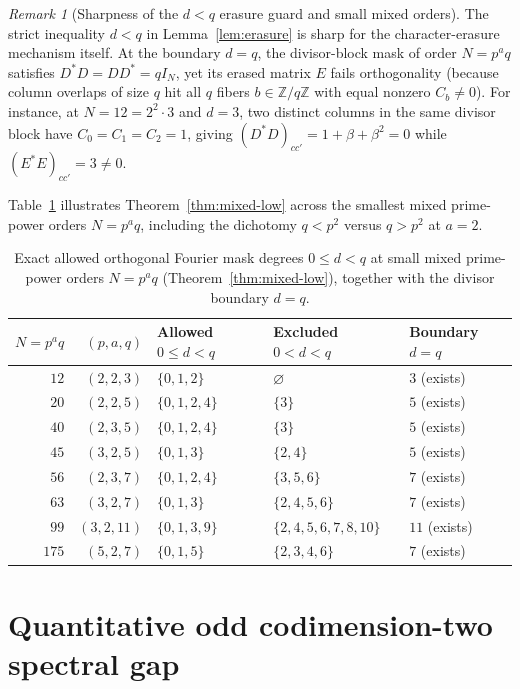 \documentclass[11pt,reqno]{amsart}
\numberwithin{equation}{section}
\theoremstyle{definition}
\theoremstyle{remark}
\newtheorem{remark}[theorem]{Remark}
\newcommand{\Z}{\mathbb{Z}}
\begin{document}
\begin{remark}[Sharpness of the $d<q$ erasure guard and small mixed orders]
\label{rem:boundary-guard}
The strict inequality $d<q$ in Lemma~\ref{lem:erasure} is sharp for the character-erasure mechanism itself. At the boundary $d=q$, the divisor-block mask of order $N=p^a q$ satisfies $D^*D=DD^*=qI_N$, yet its erased matrix $E$ fails orthogonality (because column overlaps of size $q$ hit all $q$ fibers $b\in\Z/q\Z$ with equal nonzero $C_b\neq 0$). For instance, at $N=12=2^2\cdot 3$ and $d=3$, two distinct columns in the same divisor block have $C_0=C_1=C_2=1$, giving $(D^*D)_{cc'}=1+\beta+\beta^2=0$ while $(E^*E)_{cc'}=3\neq 0$.

Table~\ref{tab:mixed-degrees} illustrates Theorem~\ref{thm:mixed-low} across the smallest mixed prime-power orders $N=p^a q$, including the dichotomy $q<p^2$ versus $q>p^2$ at $a=2$.
\end{remark}

\begin{table}[ht]
\centering
\caption{Exact allowed orthogonal Fourier mask degrees $0\le d<q$ at small mixed prime-power orders $N=p^a q$ (Theorem~\ref{thm:mixed-low}), together with the divisor boundary $d=q$.}
\label{tab:mixed-degrees}
\begin{tabular}{rrlll}
\toprule
$N=p^a q$ & $(p,a,q)$ & Allowed $0\le d<q$ & Excluded $0<d<q$ & Boundary $d=q$ \\
\midrule
$12$ & $(2,2,3)$ & $\{0,1,2\}$ & $\varnothing$ & $3$ (exists) \\
$20$ & $(2,2,5)$ & $\{0,1,2,4\}$ & $\{3\}$ & $5$ (exists) \\
$40$ & $(2,3,5)$ & $\{0,1,2,4\}$ & $\{3\}$ & $5$ (exists) \\
$45$ & $(3,2,5)$ & $\{0,1,3\}$ & $\{2,4\}$ & $5$ (exists) \\
$56$ & $(2,3,7)$ & $\{0,1,2,4\}$ & $\{3,5,6\}$ & $7$ (exists) \\
$63$ & $(3,2,7)$ & $\{0,1,3\}$ & $\{2,4,5,6\}$ & $7$ (exists) \\
$99$ & $(3,2,11)$ & $\{0,1,3,9\}$ & $\{2,4,5,6,7,8,10\}$ & $11$ (exists) \\
$175$ & $(5,2,7)$ & $\{0,1,5\}$ & $\{2,3,4,6\}$ & $7$ (exists) \\
\bottomrule
\end{tabular}
\end{table}

\section{Quantitative odd codimension-two spectral gap}
\label{sec:codim2}
\end{document}
